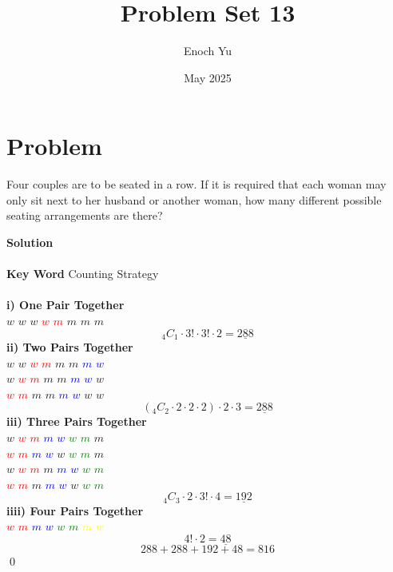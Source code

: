 \documentclass{article}
\title{Problem Set 13}
\author{Enoch Yu}
\date{May 2025}
\newenvironment{solution}{\begin{trivlist}\item[]{\bf Solution}}{\qed \end{trivlist}}
\begin{document}
\section*{Problem}
Four couples are to be seated in a row. If it is required that each woman may only sit next to her husband or another woman, how many different possible seating arrangements are there?
\begin{solution}
\\\\
\textbf{Key Word} Counting Strategy
\\\\
\textbf{i) One Pair Together} \\
$w$ $w$ $w$ \textcolor{red}{$w$} \textcolor{red}{$m$} $m$ $m$ $m$
\[
{}_4C_1\cdot3!\cdot3!\cdot2=\underline{288}
\]
\textbf{ii) Two Pairs Together} \\
$w$ $w$ \textcolor{red}{$w$} \textcolor{red}{$m$} $m$ $m$ \textcolor{blue}{$m$} \textcolor{blue}{$w$} \\
$w$ \textcolor{red}{$w$} \textcolor{red}{$m$} $m$ $m$ \textcolor{blue}{$m$} \textcolor{blue}{$w$} $w$ \\
\textcolor{red}{$w$} \textcolor{red}{$m$} $m$ $m$ \textcolor{blue}{$m$} \textcolor{blue}{$w$} $w$ $w$
\[
({}_4C_2\cdot2\cdot2\cdot2)\cdot2\cdot3=\underline{288}
\]
\textbf{iii) Three Pairs Together} \\
$w$ \textcolor{red}{$w$} \textcolor{red}{$m$} \textcolor{blue}{$m$} \textcolor{blue}{$w$} \textcolor{green}{$w$} \textcolor{green}{$m$} $m$\\
\textcolor{red}{$w$} \textcolor{red}{$m$} \textcolor{blue}{$m$} \textcolor{blue}{$w$} $w$ \textcolor{green}{$w$} \textcolor{green}{$m$} $m$\\
$w$ \textcolor{red}{$w$} \textcolor{red}{$m$} $m$ \textcolor{blue}{$m$} \textcolor{blue}{$w$} \textcolor{green}{$w$} \textcolor{green}{$m$} \\
\textcolor{red}{$w$} \textcolor{red}{$m$} $m$ \textcolor{blue}{$m$} \textcolor{blue}{$w$} $w$ \textcolor{green}{$w$} \textcolor{green}{$m$}
\[
{}_4C_3\cdot2\cdot3!\cdot4=\underline{192}
\]
\textbf{iiii) Four Pairs Together} \\
\textcolor{red}{$w$} \textcolor{red}{$m$} \textcolor{blue}{$m$} \textcolor{blue}{$w$} \textcolor{green}{$w$} \textcolor{green}{$m$} \textcolor{yellow}{$m$} \textcolor{yellow}{$w$}
\[
4!\cdot2=\underline{48}
\]
\[
288+288+192+48=\boxed{816}
\]
\end{solution}
\end{document}
